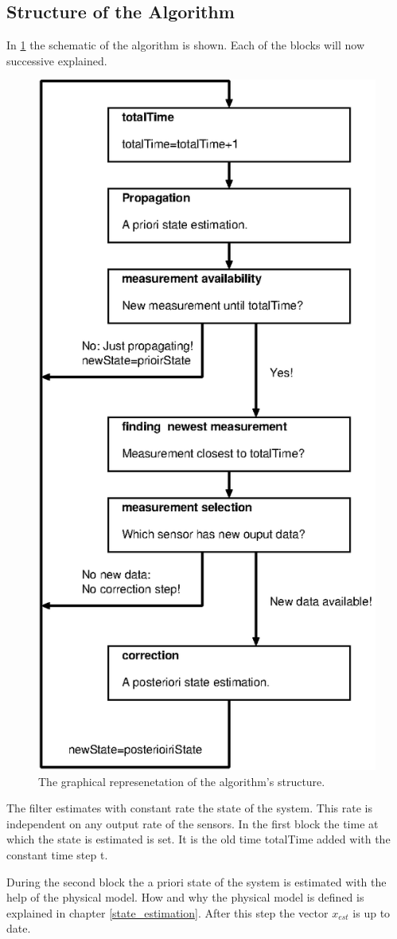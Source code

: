 \subsection*{Structure of the Algorithm}
In \ref{structure_algo} the schematic of the algorithm is shown. Each of the blocks will now successive explained.
\begin{figure}
\begin{center}
\includegraphics[width=8 cm]{pictures/structure_algo_1.eps}
\caption{The graphical represenetation of the algorithm's structure.}
\label{structure_algo}
\end{center}
\end{figure}

\item[Block 1, totalTime:]
The filter estimates with constant rate the state of the system. This rate is independent on any output rate of the sensors. In the first block the time at which the state is estimated is set. It is the old time totalTime added with the constant time step t.

\item[Block 2, Propagation:]
During the second block the a priori state of the system is estimated with the help of the physical model. How and why the physical model is defined is explained in chapter \ref{state_estimation}. After this step the vector $x_{est}$ is up to date.

